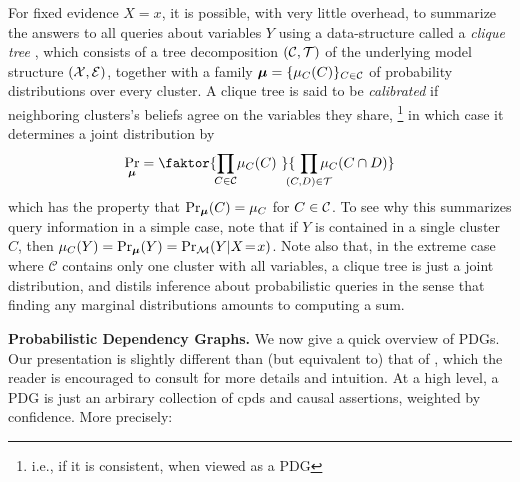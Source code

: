 \documentclass[twoside]{article}
\begin{document}
For fixed evidence
$X \!=\! x$, it is possible, with very
little overhead, to summarize the answers to all queries about variables
$Y$ using a data-structure called a \emph{clique tree}
\parencite[\S10]{koller2009probabilistic}, which consists of
a tree decomposition $(\cal C, T)$
of the underlying model structure $(\cal X, E)$, together with a family $\boldsymbol\mu = \{\mu_C(C)\}_{ C \in \mathcal C}$ of probability distributions over every cluster.
A clique tree is said to be \emph{calibrated} if neighboring clusters's beliefs agree on the variables they share,%
    \footnote{i.e., if it is consistent, when viewed as a PDG}
in which case it determines a joint distribution by
\begin{equation}
    \Pr_{\bmu} = \faktor
        {\prod_{\mathclap{C \in \cal C}} \mu_C(C)~}
        {~\prod_{\mathclap{(C,D) \in \cal T}} \mu_{C}(C \cap D)}
    \label{eq:cliquedist}
\end{equation}
which has the property that $\Pr_{\boldsymbol\mu}(C) = \mu_C$ for $C \in \cal C$.
To see why this summarizes query information in a simple case, note that if $Y$ is contained in a single cluster $C$, then $\mu_C(Y) = \Pr_{\boldsymbol\mu}(Y) = \Pr_{\cal M}(Y | X \!=\! x)$.
Note also that, in the extreme case where $\mathcal C$ contains only one cluster with all variables, a clique tree is just a joint distribution, and distils inference about probabilistic queries in the sense that finding any marginal distributions amounts to computing a sum.

\textbf{Probabilistic Dependency Graphs.}
We now give a quick overview of PDGs. Our presentation is slightly
different than (but equivalent to) that of
\textcite{pdg-aaai}, which
the reader is encouraged to consult for more details and intuition.
At a high level, a PDG
is just an arbirary collection of cpds and causal assertions,
    weighted by confidence. More precisely:
\end{document}
